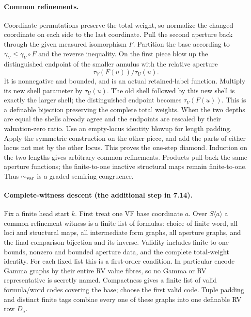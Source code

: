 \paragraph{Common refinements.}
Coordinate permutations preserve the total weight, so normalize the
changed coordinate on each side to the last coordinate. Pull the second
aperture back through the given measured isomorphism $F$. Partition the
base according to $\gamma_U\leq\gamma_V\circ F$ and the reverse inequality.
On the first piece blow up the distinguished endpoint of the smaller
annulus with the relative aperture
\[
 \tau_{V}(F(u))/\tau_U(u).
\]
It is nonnegative and bounded, and is an actual retained-label function.
Multiply its new shell parameter by $\tau_U(u)$. The old shell followed
by this new shell is exactly the larger shell; the distinguished
endpoint becomes $\tau_V(F(u))$. This is a definable bijection preserving
the complete total weights. When the two depths are equal the shells
already agree and the endpoints are rescaled by their valuation-zero
ratio. Use an empty-locus identity blowup for length padding.
Apply the symmetric construction on the other piece, and add the
parts of either locus not met by the other locus. This proves the
one-step diamond. Induction on the two lengths gives arbitrary common
refinements. Products pull back the same aperture functions; the
finite-to-one inactive structural maps remain finite-to-one. Thus
$\sim_{\rm var}$ is a graded semiring congruence.

\paragraph{Complete-witness descent (the additional step in 7.14).}
Fix a finite head start $k$. First treat one VF base coordinate $a$.
Over $S\langle a\rangle$ a common-refinement witness is a finite list
of formulas: choice of finite word, all loci and structural maps, all
intermediate form graphs, all aperture graphs, and the final comparison
bijection and its inverse. Validity includes finite-to-one bounds,
nonzero and bounded aperture data, and the complete total-weight
identity. For each fixed list this is a first-order condition. In
particular encode Gamma graphs by their entire RV value fibres, so no
Gamma or RV representative is secretly named. Compactness gives a
finite list of valid formula/word codes covering the base; choose the
first valid code. Tuple padding and distinct finite tags combine every
one of these graphs into one definable RV row $D_a$.

